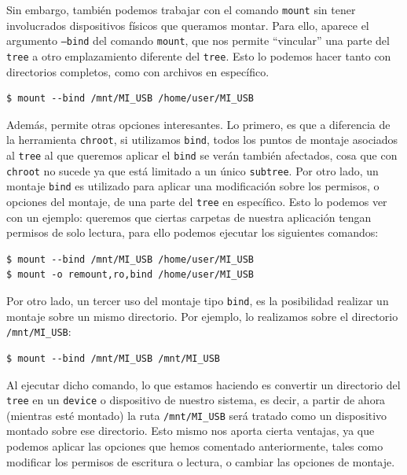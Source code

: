 \documentclass[a4paper, oneside, 12pt]{book}
\begin{document}
	\noindent Sin embargo, también podemos trabajar con el comando \texttt{mount} sin tener involucrados dispositivos físicos que queramos montar. Para ello, aparece el argumento \texttt{--bind} del comando \texttt{mount}, que nos permite ``vincular'' una parte del \texttt{tree} a otro emplazamiento diferente del \texttt{tree}. Esto lo podemos hacer tanto con directorios completos, como con archivos en específico.
	
	\begin{verbatim}
$ mount --bind /mnt/MI_USB /home/user/MI_USB
	\end{verbatim}

	\noindent Además, permite otras opciones interesantes. Lo primero, es que a diferencia de la herramienta \texttt{chroot}, si utilizamos \texttt{bind}, todos los puntos de montaje asociados al \texttt{tree} al que queremos aplicar el \texttt{bind} se verán también afectados, cosa que con \texttt{chroot} no sucede ya que está limitado a un único \texttt{subtree}. Por otro lado, un montaje \texttt{bind} es utilizado para aplicar una modificación sobre los permisos, o opciones del montaje, de una parte del \texttt{tree} en específico. Esto lo podemos ver con un ejemplo: queremos que ciertas carpetas de nuestra aplicación tengan permisos de solo lectura, para ello podemos ejecutar los siguientes comandos:
	
	\begin{verbatim}
$ mount --bind /mnt/MI_USB /home/user/MI_USB
$ mount -o remount,ro,bind /home/user/MI_USB
	\end{verbatim}

	\noindent Por otro lado, un tercer uso del montaje tipo \texttt{bind}, es la posibilidad realizar un montaje sobre un mismo directorio. Por ejemplo, lo realizamos sobre el directorio \texttt{/mnt/MI\_USB}:
	
	\begin{verbatim}
$ mount --bind /mnt/MI_USB /mnt/MI_USB
	\end{verbatim}

	\noindent Al ejecutar dicho comando, lo que estamos haciendo es convertir un directorio del \texttt{tree} en un \texttt{device} o dispositivo de nuestro sistema, es decir, a partir de ahora (mientras esté montado) la ruta \texttt{/mnt/MI\_USB} será tratado como un dispositivo montado sobre ese directorio. Esto mismo nos aporta cierta ventajas, ya que podemos aplicar las opciones que hemos comentado anteriormente, tales como modificar los permisos de escritura o lectura, o cambiar las opciones de montaje.
\end{document}
